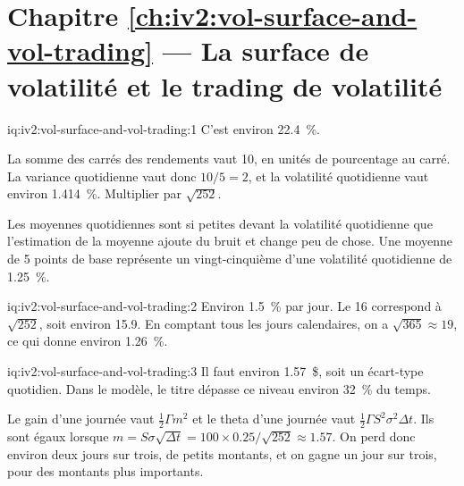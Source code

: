 \section*{Chapitre \ref{ch:iv2:vol-surface-and-vol-trading} --- La surface de volatilité et le trading de volatilité}

\begin{solution}{iq:iv2:vol-surface-and-vol-trading:1}
C'est environ 22.4~\%.

La somme des carrés des rendements vaut 10, en unités de pourcentage au carré. La variance quotidienne vaut donc $10/5 = 2$, et la volatilité quotidienne vaut environ 1.414~\%. Multiplier par $\sqrt{252}$.

Les moyennes quotidiennes sont si petites devant la volatilité quotidienne que l'estimation de la moyenne ajoute du bruit et change peu de chose. Une moyenne de 5 points de base représente un vingt-cinquième d'une volatilité quotidienne de 1.25~\%.

\end{solution}

\begin{solution}{iq:iv2:vol-surface-and-vol-trading:2}
Environ 1.5~\% par jour. Le 16 correspond à $\sqrt{252}$, soit environ 15.9. En comptant tous les jours calendaires, on a $\sqrt{365} \approx 19$, ce qui donne environ 1.26~\%.

\end{solution}

\begin{solution}{iq:iv2:vol-surface-and-vol-trading:3}
Il faut environ 1.57~\$, soit un écart-type quotidien. Dans le modèle, le titre dépasse ce niveau environ 32~\% du temps.

Le gain d'une journée vaut $\tfrac12\Gamma m^2$ et le theta d'une journée vaut $\tfrac12\Gamma S^2\sigma^2\Delta t$. Ils sont égaux lorsque $m = S\sigma\sqrt{\Delta t} = 100 \times 0.25/\sqrt{252} \approx 1.57$. On perd donc environ deux jours sur trois, de petits montants, et on gagne un jour sur trois, pour des montants plus importants.

\end{solution}

